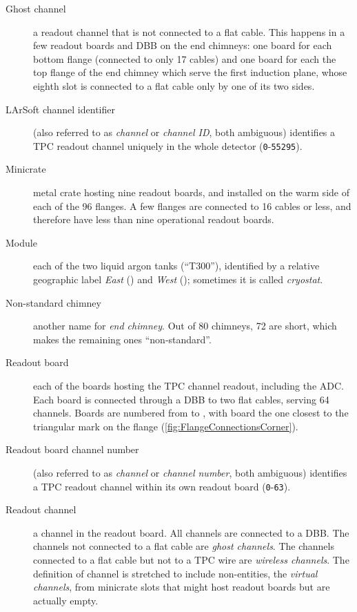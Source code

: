 \begin{description}
  \item[Ghost channel]
    a readout channel that is not connected to a flat cable.
    This happens in a few readout boards and DBB on the end chimneys:
    one board for each bottom flange (connected to only 17 cables)
    and one board for each the top flange of the end chimney which serve the
    first induction plane, whose eighth slot is connected to a flat cable only
    by one of its two sides.
  
  \item[\hypertarget{glossary:LArSoftChannelID}{LArSoft channel identifier}]
    (also referred to as \emph{channel} or \emph{channel ID}, both ambiguous)
    identifies a TPC readout channel uniquely in the whole detector
    (\texttt{0}-\texttt{55295}).
  
  \item[\hypertarget{glossary:minicrate}{Minicrate}]
    metal crate hosting nine readout boards,
    and installed on the warm side of each of the 96 flanges.
    A few flanges are connected to 16 cables or less, and therefore have
    less than nine operational readout boards.

  \item[Module]
    each of the two liquid argon tanks (``T300''), identified by
    a relative geographic label \emph{East} () and \emph{West}
    (); sometimes it is called \emph{cryostat}.

  \item[Non-standard chimney]
    another name for \emph{end chimney}.
    Out of 80 chimneys, 72 are short, which makes the remaining ones ``non-standard''.

  \item[Readout board]
    each of the boards hosting the TPC channel readout, including the ADC.
    Each board is connected through a DBB to two flat cables, serving 64 channels.
    Boards are numbered from  to , with board 
    the one closest to the triangular mark on the flange
    (\cref{fig:FlangeConnectionsCorner}).

  \item[\hypertarget{glossary:ReadoutChannelNumber}{Readout board channel number}]
    (also referred to as \emph{channel} or \emph{channel number}, both ambiguous)
    identifies a TPC readout channel within its own readout board
    (\texttt{0}-\texttt{63}).
  
  \item[Readout channel]
    a channel in the readout board. All channels are connected to a DBB.
    The channels not connected to a flat cable are \emph{ghost channels}.
    The channels connected to a flat cable but not to a TPC wire are
    \emph{wireless channels}. The definition of channel is stretched to include
    non-entities, the \emph{virtual channels}, from minicrate slots that might
    host readout boards but are actually empty.
  

\end{description}
